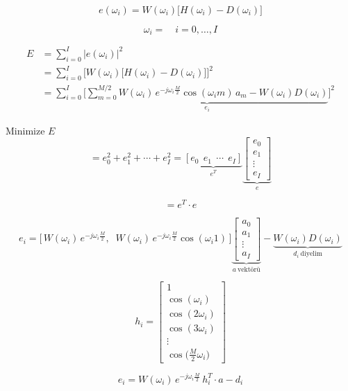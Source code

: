 \documentclass[11pt,a4paper]{article}
\begin{document}
\[ e(\omega_i) = W(\omega_i)\big[ H(\omega_i) - D(\omega_i) \big] \]

\[ \omega_i = \quad i = 0,\ldots,I \]

\begin{align*}
E &= \sum_{i=0}^{I} |e(\omega_i)|^2 \\
&= \sum_{i=0}^{I} \Big[ W(\omega_i)\big[H(\omega_i) - D(\omega_i)\big] \Big]^2 \\
&= \sum_{i=0}^{I} \Big[ \underbrace{\sum_{m=0}^{M/2} W(\omega_i)\, e^{-j\omega_i \frac{M}{2}} \cos(\omega_i m)\, a_m - W(\omega_i) D(\omega_i)}_{e_i} \Big]^2
\end{align*}

Minimize $E$
\[ {}= e_0^2 + e_1^2 + \cdots + e_I^2 = \underbrace{[e_0\ \ e_1\ \ \cdots\ \ e_I]}_{e^T} \underbrace{\begin{bmatrix} e_0 \\ e_1 \\ \vdots \\ e_I \end{bmatrix}}_{e} \]

\[ {}= e^T \cdot e \]

\[ e_i = \big[\, W(\omega_i)\, e^{-j\omega_i\frac{M}{2}}, \;\; W(\omega_i)\, e^{-j\omega_i\frac{M}{2}} \cos(\omega_i 1) \,\big] \underbrace{\begin{bmatrix} a_0 \\ a_1 \\ \vdots \\ a_I \end{bmatrix}}_{a\ \text{vektörü}} - \underbrace{W(\omega_i) D(\omega_i)}_{d_i\ \text{diyelim}} \]

\[ h_i = \begin{bmatrix} 1 \\ \cos(\omega_i) \\ \cos(2\omega_i) \\ \cos(3\omega_i) \\ \vdots \\ \cos\big(\frac{M}{2}\omega_i\big) \end{bmatrix} \]

\[ e_i = W(\omega_i)\, e^{-j\omega_i\frac{M}{2}}\, h_i^T \cdot a - d_i \]
\end{document}
